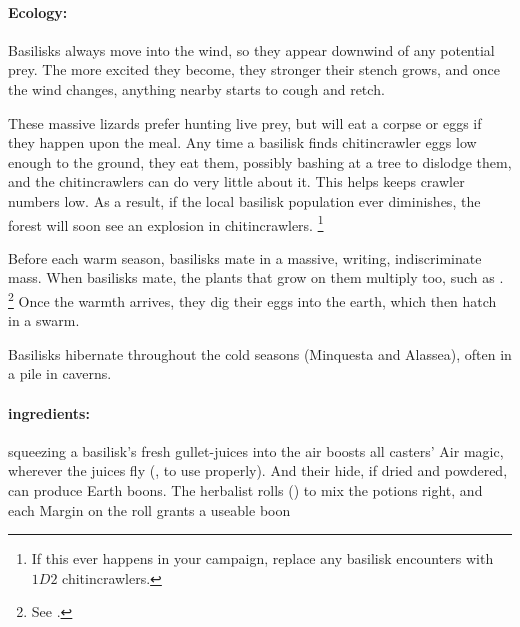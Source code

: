 \begin{multicols}{2}
\paragraph{Ecology:}
Basilisks always move into the wind, so they appear downwind of any potential prey.
The more excited they become, they stronger their stench grows, and once the wind changes, anything nearby starts to cough and retch.

These massive lizards prefer hunting live prey, but will eat a corpse or eggs if they happen upon the meal.
Any time a basilisk finds chitincrawler eggs low enough to the ground, they eat them, possibly bashing at a tree to dislodge them, and the chitincrawlers can do very little about it.
This helps keeps crawler numbers low.
As a result, if the local basilisk population ever diminishes, the forest will soon see an explosion in chitincrawlers.%
\footnote{If this ever happens in your campaign, replace any basilisk encounters with $1D2$ chitincrawlers.}

Before each warm season, basilisks mate in a massive, writing, indiscriminate mass.
When basilisks mate, the plants that grow on them multiply too, such as .%
\footnote{See .}
Once the warmth arrives, they dig their eggs into the earth, which then hatch in a swarm.

\basiliskSwarm

\noindent
Basilisks hibernate throughout the cold seasons (Minquesta and Alassea), often in a pile in caverns.

\paragraph{\Glspl{ingredient}:}
squeezing a basilisk's fresh gullet-juices into the air boosts all casters' Air magic, wherever the juices fly (, \tn[10] to use properly).
And their hide, if dried and powdered, can produce Earth \glspl{boon}.
The herbalist rolls  (\tn[10]) to mix the potions right, and each Margin on the roll grants a useable \gls{boon}

\showEnc


\end{multicols}
